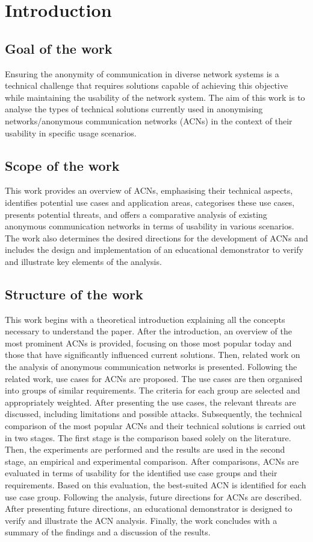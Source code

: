 \chapter{Introduction}

\section{Goal of the work}
Ensuring the anonymity of communication in diverse network systems is a technical challenge that requires solutions capable of achieving this objective while maintaining the usability of the network system. The aim of this work is to analyse the types of technical solutions currently used in anonymising networks/anonymous communication networks (ACNs) in the context of their usability in specific usage scenarios.

\section{Scope of the work}
This work provides an overview of ACNs, emphasising their technical aspects, identifies potential use cases and application areas, categorises these use cases, presents potential threats, and offers a comparative analysis of existing anonymous communication networks in terms of usability in various scenarios. The work also determines the desired directions for the development of ACNs and includes the design and implementation of an educational demonstrator to verify and illustrate key elements of the analysis.

\section{Structure of the work}
This work begins with a theoretical introduction explaining all the concepts necessary to understand the paper.
After the introduction, an overview of the most prominent ACNs is provided, focusing on those most popular today and those that have significantly influenced current solutions.
Then, related work on the analysis of anonymous communication networks is presented.
Following the related work, use cases for ACNs are proposed. The use cases are then organised into groups of similar requirements. The criteria for each group are selected and appropriately weighted.
After presenting the use cases, the relevant threats are discussed, including limitations and possible attacks.
Subsequently, the technical comparison of the most popular ACNs and their technical solutions is carried out in two stages. The first stage is the comparison based solely on the literature. Then, the experiments are performed and the results are used in the second stage, an empirical and experimental comparison.
After comparisons, ACNs are evaluated in terms of usability for the identified use case groups and their requirements. Based on this evaluation, the best-suited ACN is identified for each use case group.
Following the analysis, future directions for ACNs are described.
After presenting future directions, an educational demonstrator is designed to verify and illustrate the ACN analysis.
Finally, the work concludes with a summary of the findings and a discussion of the results.

